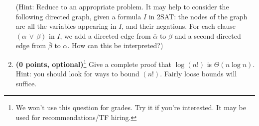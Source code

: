 \documentclass[11pt]{article}
\begin{document}
\begin{enumerate}
(Hint: Reduce to an appropriate problem.  It may help to consider the
following directed graph, given a formula $I$ in 2SAT: the nodes of
the graph are all the variables appearing in $I$, and their negations.
For each clause $(\alpha \, \vee \, \beta)$ in $I$, we add a directed
edge from $\overline{\alpha}$ to $\beta$ and a second directed edge
from $\overline{\beta}$ to $\alpha$.  How can this be interpreted?)

\item
{\bf (0 points, optional)}\footnote{We won't use this question for grades. Try it if you're interested. 
It may be used for recommendations/TF hiring.}
Give a
complete proof that $\log (n!)$ is $\Theta(n \log n)$.  Hint: you
should look for ways to bound $(n!)$.  Fairly loose bounds will
suffice.
\end{enumerate}
\end{document}
